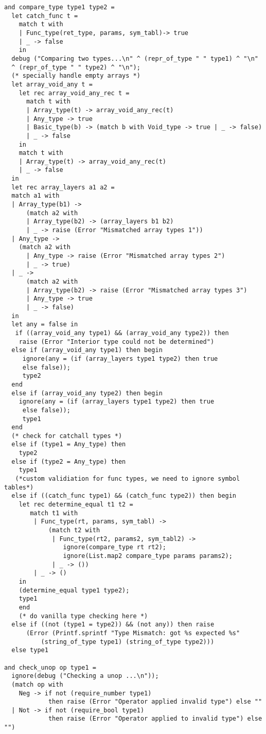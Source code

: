 \begin{verbatim}
and compare_type type1 type2 =
  let catch_func t =
    match t with
    | Func_type(ret_type, params, sym_tabl)-> true
    | _ -> false
    in
  debug ("Comparing two types...\n" ^ (repr_of_type " " type1) ^ "\n"
  ^ (repr_of_type " " type2) ^ "\n");
  (* specially handle empty arrays *)
  let array_void_any t =
    let rec array_void_any_rec t =
      match t with
      | Array_type(t) -> array_void_any_rec(t)
      | Any_type -> true
      | Basic_type(b) -> (match b with Void_type -> true | _ -> false)
      | _ -> false
    in
    match t with
    | Array_type(t) -> array_void_any_rec(t)
    | _ -> false
  in
  let rec array_layers a1 a2 =
  match a1 with
  | Array_type(b1) ->
      (match a2 with
      | Array_type(b2) -> (array_layers b1 b2)
      | _ -> raise (Error "Mismatched array types 1"))
  | Any_type ->
    (match a2 with
      | Any_type -> raise (Error "Mismatched array types 2")
      | _ -> true)
  | _ ->
      (match a2 with
      | Array_type(b2) -> raise (Error "Mismatched array types 3")
      | Any_type -> true
      | _ -> false)
  in
  let any = false in
   if ((array_void_any type1) && (array_void_any type2)) then
    raise (Error "Interior type could not be determined")
  else if (array_void_any type1) then begin
     ignore(any = (if (array_layers type1 type2) then true
     else false));
     type2
  end
  else if (array_void_any type2) then begin
    ignore(any = (if (array_layers type1 type2) then true
     else false));
     type1
  end
  (* check for catchall types *)
  else if (type1 = Any_type) then
    type2
  else if (type2 = Any_type) then
    type1
   (*custom validiation for func types, we need to ignore symbol tables*)
  else if ((catch_func type1) && (catch_func type2)) then begin
    let rec determine_equal t1 t2 =
       match t1 with
        | Func_type(rt, params, sym_tabl) ->
            (match t2 with
             | Func_type(rt2, params2, sym_tabl2) ->
                ignore(compare_type rt rt2);
                ignore(List.map2 compare_type params params2);
             | _ -> ())
        | _ -> ()
    in
    (determine_equal type1 type2);
    type1
    end
    (* do vanilla type checking here *)
  else if ((not (type1 = type2)) && (not any)) then raise
      (Error (Printf.sprintf "Type Mismatch: got %s expected %s"
          (string_of_type type1) (string_of_type type2)))
  else type1

and check_unop op type1 =
  ignore(debug ("Checking a unop ...\n"));
  (match op with
    Neg -> if not (require_number type1)
            then raise (Error "Operator applied invalid type") else ""
  | Not -> if not (require_bool type1)
            then raise (Error "Operator applied to invalid type") else "")


\end{verbatim}

